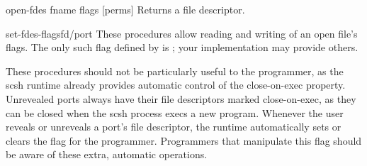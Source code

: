 \begin{defundesc} {open-fdes} {fname flags [perms]} \integer
    Returns a file descriptor.
\end{defundesc}

\begin{defundescx}{set-fdes-flags}{fd/port \integer}{\undefined}
These procedures allow reading and writing of an open file's flags.
The only such flag defined by {\Posix} is ;
your {\Unix} implementation may provide others.

These procedures should not be particularly useful to the programmer,
as the scsh runtime already provides automatic control of the close-on-exec
property.
Unrevealed ports always have their file descriptors marked
close-on-exec, as they can be closed when the scsh process execs a new program.
Whenever the user reveals or unreveals a port's file descriptor, 
the runtime automatically sets or clears the flag for the programmer.
Programmers that manipulate this flag should be aware of these extra, automatic
operations.
\end{defundescx}


